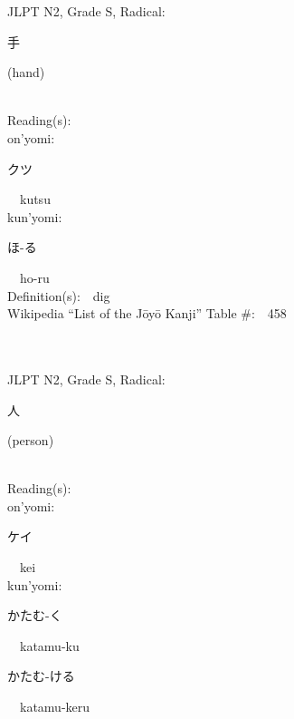 \begin{multicols}{2}
{JLPT N2, Grade S, Radical:\ \ {\begin{CJK}{UTF8}{min} 手 \end{CJK}} (hand) } \\
Reading(s):\ \ \\
{\hspace*{1em}}on'yomi:\ \ \\
{\hspace*{2em}}{\begin{CJK}{UTF8}{min} クツ \end{CJK}}\ \ kutsu\ \ \\
{\hspace*{1em}}kun'yomi:\ \ \\
{\hspace*{2em}}{\begin{CJK}{UTF8}{min} ほ-る \end{CJK}}\ \ ho-ru\ \ \\
Definition(s):\ \ dig \\
Wikipedia ``List of the J\=oy\=o Kanji'' Table \#:\ \ 458 \\
\ \ \\
{\fontsize{34pt}{40pt}  }\ \ \\  %
{JLPT N2, Grade S, Radical:\ \ {\begin{CJK}{UTF8}{min} 人 \end{CJK}} (person) } \\
Reading(s):\ \ \\
{\hspace*{1em}}on'yomi:\ \ \\
{\hspace*{2em}}{\begin{CJK}{UTF8}{min} ケイ \end{CJK}}\ \ kei\ \ \\
{\hspace*{1em}}kun'yomi:\ \ \\
{\hspace*{2em}}{\begin{CJK}{UTF8}{min} かたむ-く \end{CJK}}\ \ katamu-ku\ \ \\
{\hspace*{2em}}{\begin{CJK}{UTF8}{min} かたむ-ける \end{CJK}}\ \ katamu-keru\ \ \\

\end{multicols}
